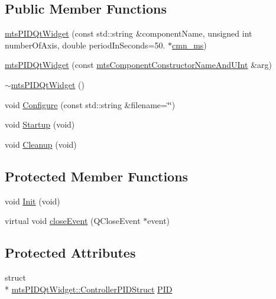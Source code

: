 \subsection*{Public Member Functions}
\begin{DoxyCompactItemize}
\item 
\hyperlink{classmts_p_i_d_qt_widget_abae1b8bbbe0364b6247f8c96133abebd}{mts\-P\-I\-D\-Qt\-Widget} (const std\-::string \&component\-Name, unsigned int number\-Of\-Axis, double period\-In\-Seconds=50. $\ast$\hyperlink{cmn_units_8h_aaf4d3f2fafb9b4a95606544b9d876b4a}{cmn\-\_\-ms})
\item 
\hyperlink{classmts_p_i_d_qt_widget_ab679845d1345b8db4526ef7610521dc4}{mts\-P\-I\-D\-Qt\-Widget} (const \hyperlink{mts_component_8h_aa605f54730dc942fd5d3b0419fbb1aa8}{mts\-Component\-Constructor\-Name\-And\-U\-Int} \&arg)
\item 
\hyperlink{classmts_p_i_d_qt_widget_a6b5814a1e488a4450bf2940126a4b31d}{$\sim$mts\-P\-I\-D\-Qt\-Widget} ()
\item 
void \hyperlink{classmts_p_i_d_qt_widget_a097275064ba6e22790d25e22b67e9d58}{Configure} (const std\-::string \&filename=\char`\"{}\char`\"{})
\item 
void \hyperlink{classmts_p_i_d_qt_widget_afb70a26b6ec801f81b0c56975ccaa810}{Startup} (void)
\item 
void \hyperlink{classmts_p_i_d_qt_widget_a8aa6a7ff2a0a459bc052aa0c824bd0ec}{Cleanup} (void)
\end{DoxyCompactItemize}
\subsection*{Protected Member Functions}
\begin{DoxyCompactItemize}
\item 
void \hyperlink{classmts_p_i_d_qt_widget_a41879786b3d20aa0bbe5c8aafc472060}{Init} (void)
\item 
virtual void \hyperlink{classmts_p_i_d_qt_widget_a4f922ab2b52b1f5be09275eee344d01d}{close\-Event} (Q\-Close\-Event $\ast$event)
\end{DoxyCompactItemize}
\subsection*{Protected Attributes}
\begin{DoxyCompactItemize}
\item 
struct \\*
\hyperlink{structmts_p_i_d_qt_widget_1_1_controller_p_i_d_struct}{mts\-P\-I\-D\-Qt\-Widget\-::\-Controller\-P\-I\-D\-Struct} \hyperlink{classmts_p_i_d_qt_widget_afbe0f5cdbb689de97e9489b92c1d2576}{P\-I\-D}
\end{DoxyCompactItemize}
